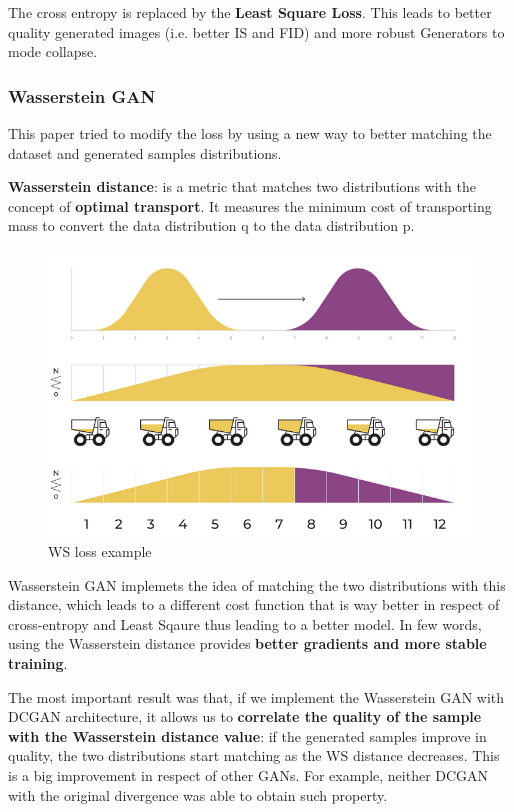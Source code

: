 The cross entropy is replaced by the \textbf{Least Square Loss}. This leads to better quality generated images (i.e. better IS and FID) and more robust Generators to mode collapse.


\subsubsection{Wasserstein GAN}

This paper tried to modify the loss by using a new way to better matching the dataset and generated samples distributions.

\textbf{Wasserstein distance}: is a metric that matches two distributions with the concept of \textbf{optimal transport}. It measures the minimum cost of transporting mass to convert the data distribution q to the data distribution p. 

\begin{figure}[H]
    \centering
    \includegraphics[width=0.75\linewidth]{tikz/WS loss.png}
    \caption{WS loss example}
    \label{fig:WS-loss}
\end{figure}

Wasserstein GAN implemets the idea of matching the two distributions with this distance, which leads to a different cost function that is way better in respect of cross-entropy and Least Sqaure thus leading to a better model. In few words, using the Wasserstein distance provides \textbf{better gradients and more stable training}. 


The most important result was that, if we implement the Wasserstein GAN with DCGAN architecture, it allows us to \textbf{correlate the quality of the sample with the Wasserstein distance value}: if the generated samples improve in quality, the two distributions start matching as the WS distance decreases. This is a big improvement in respect of other GANs. For example, neither DCGAN with the original divergence was able to obtain such property.


